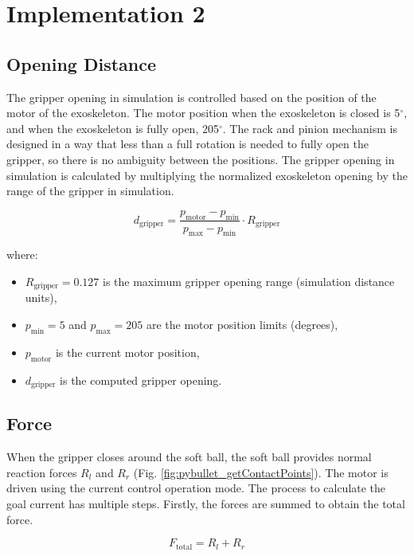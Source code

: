 \newpage
\section{Implementation 2}
\label{implementation_2}
\subsection{Opening Distance}
The gripper opening in simulation is controlled based on the position of the motor of the exoskeleton. The motor position when the exoskeleton is closed is 5$^{\circ}$, and when the exoskeleton is fully open, 205$^{\circ}$. The rack and pinion mechanism is designed in a way that less than a full rotation is needed to fully open the gripper, so there is no ambiguity between the positions. The gripper opening in simulation is calculated by multiplying the normalized exoskeleton opening by the range of the gripper in simulation.

\begin{equation}
d_{\text{gripper}} = \frac{p_{\text{motor}} - p_{\text{min}}}{p_{\text{max}} - p_{\text{min}}} \cdot R_{\text{gripper}}
\end{equation}

\noindent
where:
\begin{itemize}
\item \( R_{\text{gripper}} = 0.127 \) is the maximum gripper opening range (simulation distance units),
\item \( p_{\text{min}} = 5 \) and \( p_{\text{max}} = 205 \) are the motor position limits (degrees),
\item \( p_{\text{motor}} \) is the current motor position,
\item \( d_{\text{gripper}} \) is the computed gripper opening. 
\end{itemize}

\subsection{Force}

\noindent
When the gripper closes around the soft ball, the soft ball provides normal reaction forces $R_l$ and $R_r$ (Fig. \ref{fig:pybullet_getContactPoints}). The motor is driven using the current control operation mode. The process to calculate the goal current has multiple steps. Firstly, the forces are summed to obtain the total force.

\begin{equation}
F_{\text{total}} = R_l + R_r
\end{equation}

